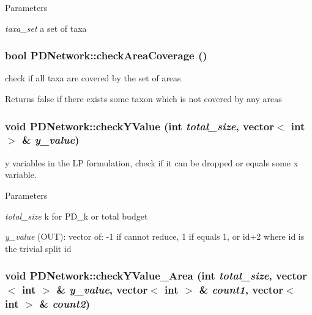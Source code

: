 \begin{DoxyParams}{Parameters}
\item[{\em taxa\_\-set}]a set of taxa \end{DoxyParams}
\hypertarget{classPDNetwork_aa7a36298000e66475cbd4f4ceab2f662}{
\subsubsection[{checkAreaCoverage}]{\setlength{\rightskip}{0pt plus 5cm}bool PDNetwork::checkAreaCoverage ()}}
\label{classPDNetwork_aa7a36298000e66475cbd4f4ceab2f662}
check if all taxa are covered by the set of areas \begin{DoxyReturn}{Returns}
false if there exists some taxon which is not covered by any areas 
\end{DoxyReturn}
\hypertarget{classPDNetwork_a1e9909731a5f229897392d802ef69a60}{
\subsubsection[{checkYValue}]{\setlength{\rightskip}{0pt plus 5cm}void PDNetwork::checkYValue (int {\em total\_\-size}, \/  vector$<$ int $>$ \& {\em y\_\-value})}}
\label{classPDNetwork_a1e9909731a5f229897392d802ef69a60}
y variables in the LP formulation, check if it can be dropped or equals some x variable. 
\begin{DoxyParams}{Parameters}
\item[{\em total\_\-size}]k for PD\_\-k or total budget \item[{\em y\_\-value}](OUT): vector of: -\/1 if cannot reduce, 1 if equals 1, or id+2 where id is the trivial split id \end{DoxyParams}
\hypertarget{classPDNetwork_a438360816421d31dc8902323ce57a497}{
\subsubsection[{checkYValue\_\-Area}]{\setlength{\rightskip}{0pt plus 5cm}void PDNetwork::checkYValue\_\-Area (int {\em total\_\-size}, \/  vector$<$ int $>$ \& {\em y\_\-value}, \/  vector$<$ int $>$ \& {\em count1}, \/  vector$<$ int $>$ \& {\em count2})}}
